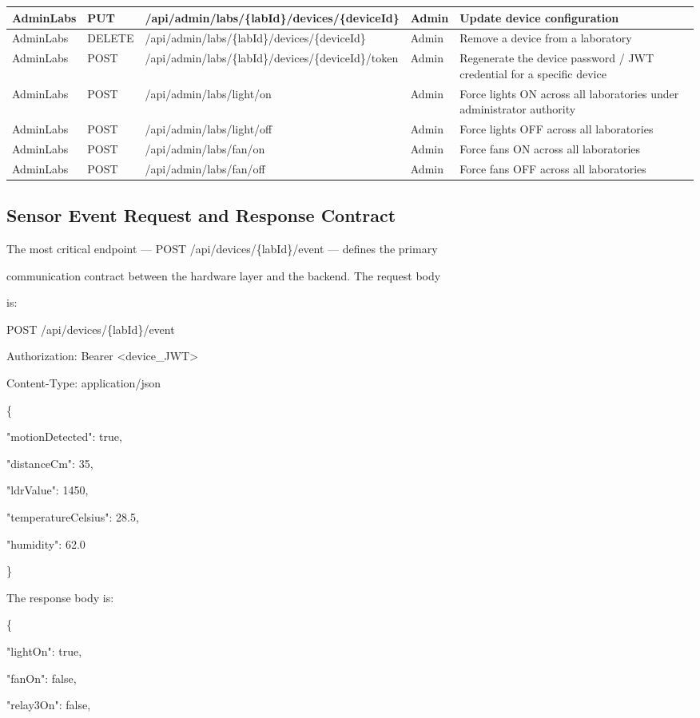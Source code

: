 {\begin{longtable}{|L{1.8cm}|L{0.8cm}|L{5.2cm}|L{1.8cm}|L{4.5cm}|}
\hline
AdminLabs & PUT & /api/admin/labs/\{labId\}/devices/\{deviceId\} & Admin & Update device configuration \\
\hline
AdminLabs & DELETE & /api/admin/labs/\{labId\}/devices/\{deviceId\} & Admin & Remove a device from a laboratory \\
\hline
AdminLabs & POST & /api/admin/labs/\{labId\}/devices/\{deviceId\}/token & Admin & Regenerate the device password / JWT credential for a specific device \\
\hline
AdminLabs & POST & /api/admin/labs/light/on & Admin & Force lights ON across all laboratories under administrator authority \\
\hline
AdminLabs & POST & /api/admin/labs/light/off & Admin & Force lights OFF across all laboratories \\
\hline
AdminLabs & POST & /api/admin/labs/fan/on & Admin & Force fans ON across all laboratories \\
\hline
AdminLabs & POST & /api/admin/labs/fan/off & Admin & Force fans OFF across all laboratories \\
\hline
\end{longtable}
}

\subsection{Sensor Event Request and Response Contract}
The most critical endpoint --- POST /api/devices/\{labId\}/event --- defines the primary

communication contract between the hardware layer and the backend. The request body

is:

POST /api/devices/\{labId\}/event

Authorization: Bearer <device\_JWT>

Content-Type: application/json

\{

"motionDetected": true,

"distanceCm": 35,

"ldrValue": 1450,

"temperatureCelsius": 28.5,

"humidity": 62.0

\}

The response body is:

\{

"lightOn": true,

"fanOn": false,

"relay3On": false,


